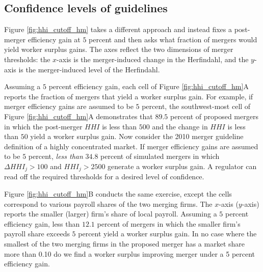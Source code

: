 \documentclass[12pt]{article}
\theoremstyle{prop}
\begin{document}
\subsection{Confidence levels of guidelines} 
Figure \ref{fig:hhi_cutoff_hm} takes a different approach and instead fixes a post-merger efficiency gain at $5$ percent and then asks what fraction of mergers would yield worker surplus gains.  
The axes reflect the two dimensions of merger thresholds: the $x$-axis is the merger-induced change in the Herfindahl, and the $y$-axis is the merger-induced level of the Herfindahl.

Assuming a $5$ percent efficiency gain, each cell of Figure \ref{fig:hhi_cutoff_hm}A reports the fraction of mergers that yield a worker surplus gain. 
For example, if merger efficiency gains are assumed to be $5$ percent, the southwest-most cell of Figure \ref{fig:hhi_cutoff_hm}A  demonstrates that $89.5$ percent of proposed mergers in which the post-merger $HHI$ is less than $500$ and the change in $HHI$ is less than $50$ yield a worker surplus gain. 
Now consider the 2010 merger guideline definition of a highly concentrated market. 
If merger efficiency gains are assumed to be $5$ percent, \textit{less than} $34.8$ percent of simulated mergers in which $\Delta HHI_j >100$ and  $HHI_j >2500$  generate a worker surplus gain.
A regulator can read off the required thresholds for a desired level of confidence. 

Figure \ref{fig:hhi_cutoff_hm}B conducts the same exercise, except the cells correspond to various payroll shares of the two merging firms. 
The $x$-axis ($y$-axis) reports the smaller (larger) firm's share of local payroll. 
Assuming a $5$  percent efficiency gain, less than $12.1$ percent of mergers in which the smaller firm's payroll share exceeds $5$ percent yield a worker surplus gain. 
In no case where the smallest of the two merging firms in the proposed merger has a market share more than 0.10 do we find a worker surplus improving merger under a 5 percent efficiency gain. 

\end{document}
